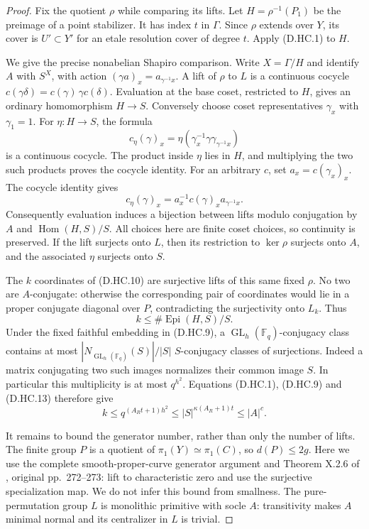 \begin{proof}
Fix the quotient $\rho$ while comparing its lifts. Let
$H=\rho^{-1}(P_1)$ be the preimage of a point stabilizer.
It has index $t$ in $\Gamma$. Since $\rho$ extends over
$Y$, its cover is $U'\subset Y'$ for an etale resolution
cover of degree $t$. Apply (D.HC.1) to $H$.

We give the precise nonabelian Shapiro comparison. Write
$X=\Gamma/H$ and identify $A$ with $S^X$, with action
$(\gamma a)_x=a_{\gamma^{-1}x}$. A lift of $\rho$ to
$L$ is a continuous cocycle
$c(\gamma\delta)=c(\gamma)\,\gamma c(\delta)$.
Evaluation at the base coset, restricted to $H$, gives
an ordinary homomorphism $H\to S$. Conversely choose
coset representatives $\gamma_x$ with $\gamma_1=1$.
For $\eta:H\to S$, the formula
\[
 c_\eta(\gamma)_x
       =\eta(\gamma_x^{-1}\gamma\gamma_{\gamma^{-1}x})
                                                               \tag{D.HC.12}
\]
is a continuous cocycle. The product inside $\eta$ lies
in $H$, and multiplying the two such products proves the
cocycle identity. For an arbitrary $c$, set
$a_x=c(\gamma_x)_x$. The cocycle identity gives
\[
 c_\eta(\gamma)_x=a_x^{-1}c(\gamma)_x a_{\gamma^{-1}x}.
\]
Consequently evaluation induces a bijection between lifts
modulo conjugation by $A$ and $\operatorname{Hom}(H,S)/S$.
All choices here are finite coset choices, so continuity
is preserved. If the lift surjects onto $L$, then its
restriction to $\ker\rho$ surjects onto $A$, and the
associated $\eta$ surjects onto $S$.

The $k$ coordinates of (D.HC.10) are surjective lifts of
this same fixed $\rho$. No two are $A$-conjugate: otherwise
the corresponding pair of coordinates would lie in a
proper conjugate diagonal over $P$, contradicting the
surjectivity onto $L_k$. Thus
\[
                 k\leq\#\operatorname{Epi}(H,S)/S.      \tag{D.HC.13}
\]
Under the fixed faithful embedding in (D.HC.9), a
$\operatorname{GL}_h(\mathbb F_q)$-conjugacy class contains
at most
$|N_{\operatorname{GL}_h(\mathbb F_q)}(S)|/|S|$
$S$-conjugacy classes of surjections. Indeed a matrix
conjugating two such images normalizes their common
image $S$. In particular this multiplicity is at most
$q^{h^2}$. Equations (D.HC.1), (D.HC.9) and (D.HC.13)
therefore give
\[
 k\leq q^{(A_Rt+1)h^2}
       \leq |S|^{\kappa(A_R+1)t}\leq |A|^c.            \tag{D.HC.14}
\]

It remains to bound the generator number, rather than
only the number of lifts. The finite group $P$ is a
quotient of $\pi_1(Y)\simeq\pi_1(C)$, so $d(P)\leq2g$.
Here we use the complete smooth-proper-curve generator
argument and Theorem X.2.6 of \citet{SGA1}, original
pp.~272--273: lift to characteristic zero and use the
surjective specialization map. We do not infer this
bound from smallness. The pure-permutation group $L$
is monolithic primitive with socle $A$: transitivity
makes $A$ minimal normal and its centralizer in $L$
is trivial.


\end{proof}
